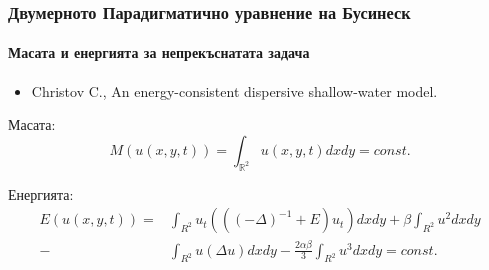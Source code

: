 \documentclass{beamer}
\newcommand{\RR}{\mathbb{R}}
\begin{document}


\begin{frame}
\frametitle{Двумерното Парадигматично уравнение на Бусинеск}
\framesubtitle{Масата и енергията за непрекъснатата задача }
\begin{itemize}
\item {\footnotesize Christov C., An energy-consistent dispersive shallow-water model.}
\end{itemize}
Масата:
\begin{equation}\label{intM}
M(u(x,y,t))=\int_{\RR^2} u(x,y,t)dx dy = const.
\end{equation}

Енергията:
\begin{align}\label{ex-en}
E(u(x,y,t)) = &\int_{R^2} u_t \left(((-\Delta)^{-1}+E)u_t\right) dxdy+
\beta \int_{R^2} u^2 dxdy \nonumber\\
-& \int_{R^2}u \left(\Delta u\right) dxdy
-\frac{2 \alpha \beta}{3} \int_{R^2} u^3 dxdy =const.
\end{align}

\end{frame}
\end{document}

